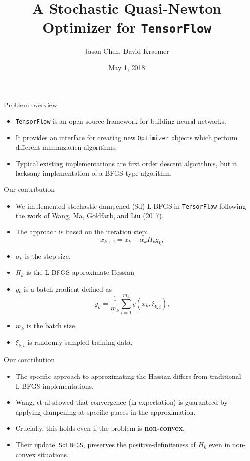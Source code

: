 \documentclass{beamer}
\title{A Stochastic Quasi-Newton Optimizer for \texttt{TensorFlow}}
\author[Chen, Kraemer]{%
Jason Chen\inst{1}, %
David Kraemer\inst{1}}
\institute[Stony Brook University]
{
  \inst{1}%
  CSE 592: Convex Optimization \\
  Stony Brook University
}
\date[2018]{May 1, 2018}
\begin{document}
\maketitle

\begin{frame}[t]{Problem overview}
  \begin{itemize}
    \item \texttt{TensorFlow} is an open source framework for building neural
      networks.
    \item It provides an interface for creating new \texttt{Optimizer}
      objects which perform different minimization algorithms.
    \item Typical existing implementations are first order descent
      algorithms, but it lacks\footnotemark any implementation of a BFGS-type
      algorithm.
  \end{itemize}
\end{frame}

\begin{frame}[t]{Our contribution}
  \begin{itemize}
    \item We implemented stochastic dampened (Sd) L-BFGS in \texttt{TensorFlow} following the
      work of Wang, Ma, Goldfarb, and Liu (2017).
    \item The approach is based on the iteration step:
      \[
        x_{k+1} = x_k - \alpha_k H_k g_k,
      \]
    \item $\alpha_k$ is the step size,
    \item $H_k$ is the L-BFGS approximate Hessian,
    \item $g_k$ is a batch gradient defined as
      \begin{equation*}
        g_k = \frac{1}{m_k} \sum_{i=1}^{m_k} g(x_k, \xi_{k,i}),
      \end{equation*}
    \item $m_k$ is the batch size,
    \item $\xi_{k,i}$ is randomly sampled training data.
  \end{itemize}
\end{frame}

\begin{frame}[t]{Our contribution}
  \begin{itemize}
    \item The specific approach to approximating the Hessian differs from
      traditional L-BFGS implementations.
    \item Wang, et al showed that convergence (in expectation) is guaranteed by
      applying dampening at specific places in the approximation.
    \item Crucially, this holds even if the problem is \textbf{non-convex}.
    \item Their update, \texttt{SdLBFGS}, preserves the positive-definiteness of
      $H_k$ even in non-convex situations.
  \end{itemize}
\end{frame}
\end{document}
